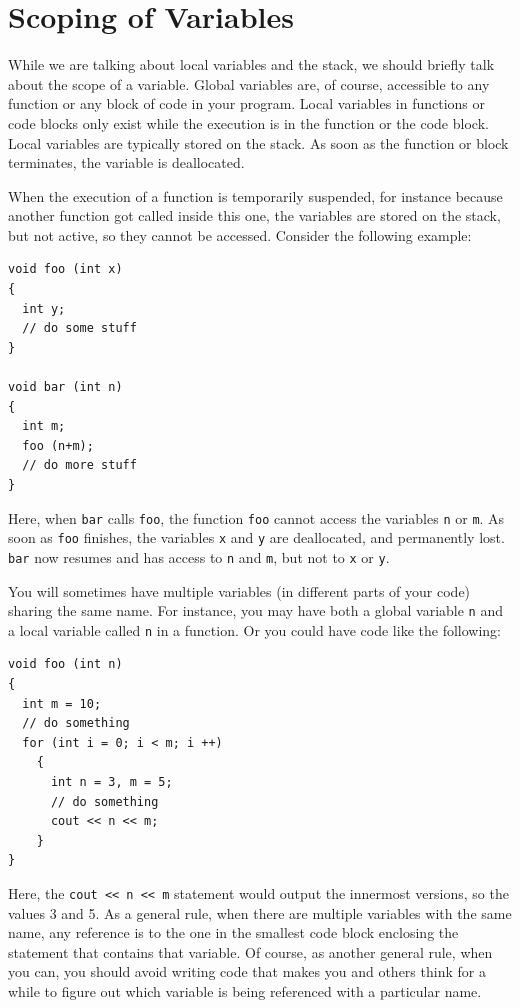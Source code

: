 \section{Scoping of Variables}
While we are talking about local variables and the stack, we should
briefly talk about the scope of a variable.
Global variables are, of course, accessible to any function or any
block of code in your program.
Local variables in functions or code blocks only exist while the
execution is in the function or the code block.
Local variables are typically stored on the stack.
As soon as the function or block terminates,
the variable is deallocated. 

When the execution of a function is temporarily suspended,
for instance because another function got called inside this one,
the variables are stored on the stack, but not active,
so they cannot be accessed.
Consider the following example:

\begin{verbatim}
void foo (int x)
{
  int y; 
  // do some stuff
}

void bar (int n)
{ 
  int m;
  foo (n+m);
  // do more stuff
}
\end{verbatim}

Here, when \texttt{bar} calls \texttt{foo}, the function \texttt{foo} cannot
access the variables \texttt{n} or \texttt{m}.
As soon as \texttt{foo} finishes, the variables \texttt{x} and \texttt{y}
are deallocated, and permanently lost.
\texttt{bar} now resumes and has access to \texttt{n} and \texttt{m},
but not to \texttt{x} or \texttt{y}.

You will sometimes have multiple variables (in different parts of your
code) sharing the same name.
For instance, you may have both a global variable \texttt{n} and a local
variable called \texttt{n} in a function.
Or you could have code like the following:

\begin{verbatim}
void foo (int n)
{
  int m = 10;
  // do something
  for (int i = 0; i < m; i ++)
    {
      int n = 3, m = 5;
      // do something
      cout << n << m;
    }
}
\end{verbatim}

Here, the \texttt{cout << n << m} statement would output the innermost
versions, so the values 3 and 5.
As a general rule, when there are multiple variables with the same name,
any reference is to the one in the smallest code block enclosing the
statement that contains that variable.
Of course, as another general rule, when you can, you should avoid
writing code that makes you and others think for a while to figure out
which variable is being referenced with a particular name.

